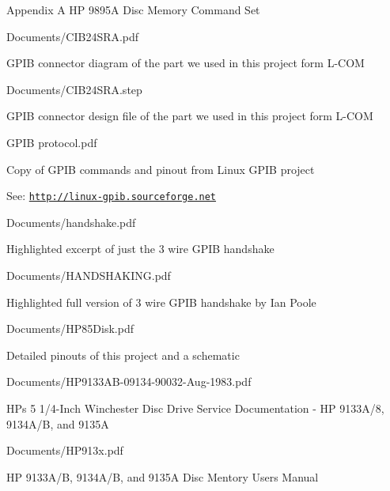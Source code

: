 \begin{DoxyPre}
\begin{DoxyItemize}
\begin{DoxyItemize}
\item Appendix A HP 9895A Disc Memory Command Set
\end{DoxyItemize}
\item Documents/CIB24SRA.pdf
\begin{DoxyItemize}
\item GPIB connector diagram of the part we used in this project form L-COM
\end{DoxyItemize}
\item Documents/CIB24SRA.step
\begin{DoxyItemize}
\item GPIB connector design file of the part we used in this project form L-COM
\end{DoxyItemize}
\item GPIB protocol.pdf
\begin{DoxyItemize}
\item Copy of GPIB commands and pinout from Linux GPIB project
\item See: \href{http://linux-gpib.sourceforge.net}{\tt http://linux-gpib.sourceforge.net}
\end{DoxyItemize}
\item Documents/handshake.pdf
\begin{DoxyItemize}
\item Highlighted excerpt of just the 3 wire GPIB handshake
\end{DoxyItemize}
\item Documents/HANDSHAKING.pdf
\begin{DoxyItemize}
\item Highlighted full version of 3 wire GPIB handshake by Ian Poole
\end{DoxyItemize}
\item Documents/HP85Disk.pdf
\begin{DoxyItemize}
\item Detailed pinouts of this project and a schematic
\end{DoxyItemize}
\item Documents/HP9133AB-09134-90032-Aug-1983.pdf
\begin{DoxyItemize}
\item HPs 5 1/4-Inch Winchester Disc Drive Service Documentation - HP 9133A/8, 9134A/B, and 9135A
\end{DoxyItemize}
\item Documents/HP913x.pdf
\begin{DoxyItemize}
\item HP 9133A/B, 9134A/B, and 9135A Disc Mentory Users Manual

\end{DoxyItemize}
\end{DoxyItemize}
\end{DoxyPre}

